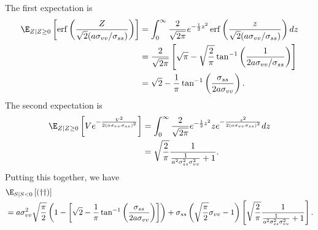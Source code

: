 \documentclass{article}
\begin{document}
The first expectation is
\begin{align*}
    \E_{Z \mid Z \geq 0} \left[ \operatorname{erf}\left(\frac{ Z }{\sqrt{2} (a \sigma_{vv} / \sigma_{ss})}\right) \right]
    &= \int_{0}^{\infty} \frac{2}{\sqrt{2\pi}} e^{-\frac{1}{2} z^2} \operatorname{erf}\left(\frac{ z }{\sqrt{2} (a \sigma_{vv} / \sigma_{ss})}\right) dz \\
    &= \frac{2}{\sqrt{2\pi}} \left[ \sqrt{\pi} - \sqrt{\frac{2}{\pi}} \tan^{-1} \left( \frac{ 1 }{ 2 a \sigma_{vv} / \sigma_{ss} } \right) \right] \\
    &= \sqrt{2} - \frac{1}{\pi} \tan^{-1} \left( \frac{ \sigma_{ss} }{ 2 a \sigma_{vv} } \right).
\end{align*}
The second expectation is
\begin{align*}
    \E_{Z \mid Z \geq 0} \left[ V e^{ -\frac{V^2}{2 (a \sigma_{vv} \sigma_{ss})^2} } \right]
    &= \int_{0}^{\infty} \frac{2}{\sqrt{2\pi}} e^{-\frac{1}{2} z^2} z e^{ -\frac{z^2}{2 (a \sigma_{vv} \sigma_{ss})^2} } dz \\
    &= \sqrt{\frac{2}{\pi}} \frac{1}{\frac{1}{a^2{\sigma}_{ss}^2{\sigma}_{vv}^2} + 1}.
\end{align*}
Putting this together, we have
\begin{align*}
    &\E_{S \mid S < 0} \left[ (\dagger \dagger) \right] \\
    &= a \sigma_{vv}^2\sqrt{\frac{\pi}{2}} \left( 1 - \left[ \sqrt{2} - \frac{1}{\pi} \tan^{-1} \left( \frac{ \sigma_{ss} }{ 2 a \sigma_{vv} } \right) \right] \right) + \sigma_{ss} \left( \sqrt{\frac{\pi}{2}} \sigma_{vv} - 1 \right) \left[ \sqrt{\frac{2}{\pi}} \frac{1}{\frac{1}{a^2{\sigma}_{ss}^2{\sigma}_{vv}^2} + 1} \right]. %
\end{align*}
\end{document}
